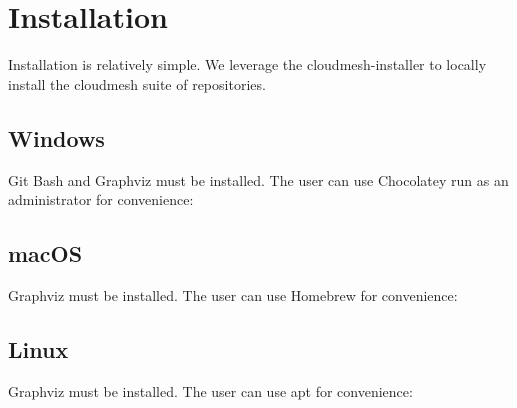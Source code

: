 \section{Installation}\label{installation}

Installation is relatively simple. We leverage the cloudmesh-installer
to locally install the cloudmesh suite of repositories.

\begin{Shaded}
\begin{Highlighting}[]
\end{Highlighting}
\end{Shaded}

\subsection{Windows}\label{windows}

Git Bash and Graphviz must be installed. The user can use Chocolatey run
as an administrator for convenience:

\begin{Shaded}
\begin{Highlighting}[]
 \DataTypeTok{\textbackslash{}}
 
\end{Highlighting}
\end{Shaded}

\subsection{macOS}\label{macos}

Graphviz must be installed. The user can use Homebrew for convenience:

\begin{Shaded}
\begin{Highlighting}[]
\end{Highlighting}
\end{Shaded}

\hypertarget{linux}{%
\subsection{Linux}\label{linux}}

Graphviz must be installed. The user can use apt for convenience:

\begin{Shaded}
\begin{Highlighting}[]
\end{Highlighting}
\end{Shaded}
